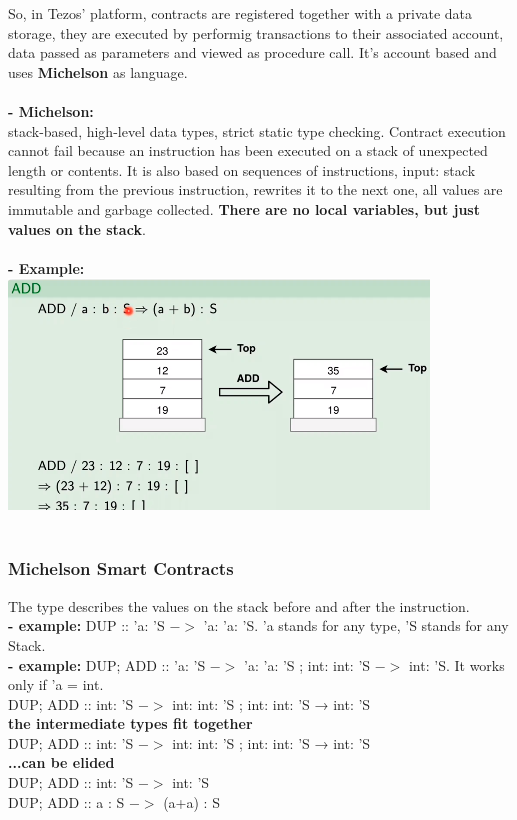 \documentclass{article}
\begin{document}
So, in Tezos' platform, contracts are registered together with a private data storage, they are executed by performig transactions to their associated account, data passed as parameters and viewed as procedure call. It's account based and uses \textbf{Michelson} as language.\\\\
\textbf{- Michelson: }\\
stack-based, high-level data types, strict static type checking. Contract execution cannot fail because an instruction has been executed on a stack of unexpected length or contents. It is also based on sequences of instructions, input: stack resulting from the previous instruction, rewrites it to the next one, all values are immutable and garbage collected. \textbf{There are no local variables, but just values on the stack}.\\\\
\textbf{- Example:}\\
\includegraphics[scale=0.6]{56.png}\\\\

\subsubsection{Michelson Smart Contracts}
The type describes the values on the stack before and after the instruction.\\
\textbf{- example:} DUP :: 'a: 'S $->$ 'a: 'a: 'S.    'a stands for any type, 'S stands for any Stack.\\
\textbf{- example:} DUP; ADD :: 'a: 'S $->$ 'a: 'a: 'S ; int: int: 'S $->$ int: 'S.  It works only if 'a = int.\\
DUP; ADD :: int: ’S $->$ int: int: ’S ; int: int: ’S → int: ’S\\
\textbf{the intermediate types fit together}\\
DUP; ADD :: int: ’S $->$ int: int: ’S ; int: int: ’S → int: ’S\\
 \textbf{...can be elided}\\
 DUP; ADD :: int: ’S $->$ int: ’S\\
 DUP; ADD :: a : S $->$ (a+a) : S\\\\
 
\end{document}
